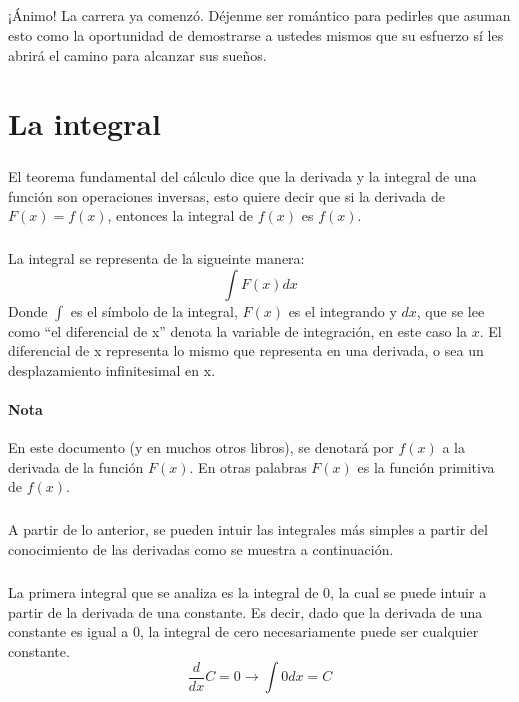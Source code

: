 \documentclass{book}
\begin{document}
        \paragraph{}¡Ánimo! La carrera ya comenzó. Déjenme ser romántico para pedirles que asuman esto como la oportunidad de demostrarse a ustedes mismos que su esfuerzo sí les abrirá el camino para alcanzar sus sueños. 
    \chapter{La integral}
        \paragraph{}El teorema fundamental del cálculo dice que la derivada y la integral de una función son operaciones inversas, esto quiere decir que si la derivada de $F(x) = f(x)$, entonces la integral de $f(x)$ es $f(x)$.
        \paragraph{}La integral se representa de la sigueinte manera:
        $$\int{F(x)dx}$$
        Donde $\int$ es el símbolo de la integral, $F(x)$ es el integrando y $dx$, que se lee como ``el diferencial de x'' denota la variable de integración, en este caso la $x$. El diferencial de x representa lo mismo que representa en una derivada, o sea un desplazamiento infinitesimal en x.
        \subsubsection{Nota}En este documento (y en muchos otros libros), se denotará por $f(x)$ a la derivada de la función $F(x)$. En otras palabras $F(x)$ es la función primitiva de $f(x)$.
        \paragraph{}A partir de lo anterior, se pueden intuir las integrales más simples a partir del conocimiento de las derivadas como se muestra a continuación.
        \paragraph{}La primera integral que se analiza es la integral de 0, la cual se puede intuir a partir de la derivada de una constante. Es decir, dado que la derivada de una constante es igual a 0, la integral de cero necesariamente puede ser cualquier constante.
        \begin{equation}
        \frac{d}{dx}C = 0\rightarrow\int{0}dx=C
        \end{equation}
\end{document}
